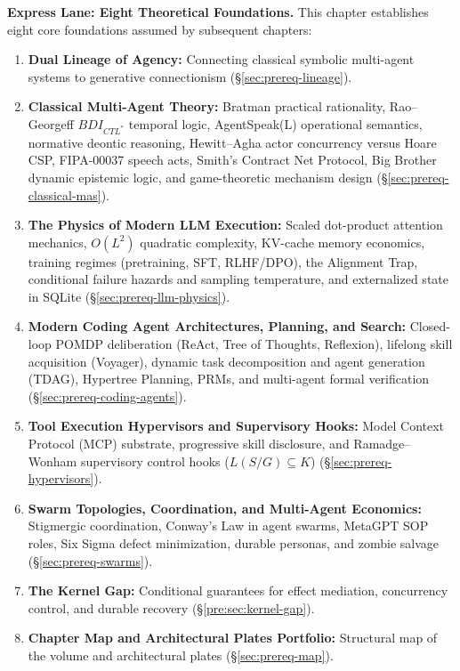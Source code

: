 \noindent\textbf{Express Lane: Eight Theoretical Foundations.} This chapter establishes eight core foundations assumed by subsequent chapters:
\begin{enumerate}[leftmargin=1.8em,itemsep=3pt]
  \item \textbf{Dual Lineage of Agency:} Connecting classical symbolic multi-agent systems to generative connectionism (\S\ref{sec:prereq-lineage}).
  \item \textbf{Classical Multi-Agent Theory:} Bratman practical rationality, Rao--Georgeff $BDI_{CTL^*}$ temporal logic, AgentSpeak(L) operational semantics, normative deontic reasoning, Hewitt--Agha actor concurrency versus Hoare CSP, FIPA-00037 speech acts, Smith's Contract Net Protocol, Big Brother dynamic epistemic logic, and game-theoretic mechanism design (\S\ref{sec:prereq-classical-mas}).
  \item \textbf{The Physics of Modern LLM Execution:} Scaled dot-product attention mechanics, $O(L^2)$ quadratic complexity, KV-cache memory economics, training regimes (pretraining, SFT, RLHF/DPO), the Alignment Trap, conditional failure hazards and sampling temperature, and externalized state in SQLite (\S\ref{sec:prereq-llm-physics}).
  \item \textbf{Modern Coding Agent Architectures, Planning, and Search:} Closed-loop POMDP deliberation (ReAct, Tree of Thoughts, Reflexion), lifelong skill acquisition (Voyager), dynamic task decomposition and agent generation (TDAG), Hypertree Planning, PRMs, and multi-agent formal verification (\S\ref{sec:prereq-coding-agents}).
  \item \textbf{Tool Execution Hypervisors and Supervisory Hooks:} Model Context Protocol (MCP) substrate, progressive skill disclosure, and Ramadge--Wonham supervisory control hooks ($L(S/G) \subseteq K$) (\S\ref{sec:prereq-hypervisors}).
  \item \textbf{Swarm Topologies, Coordination, and Multi-Agent Economics:} Stigmergic coordination, Conway's Law in agent swarms, MetaGPT SOP roles, Six Sigma defect minimization, durable personas, and zombie salvage (\S\ref{sec:prereq-swarms}).
  \item \textbf{The Kernel Gap:} Conditional guarantees for effect mediation, concurrency control, and durable recovery (\S\ref{pre:sec:kernel-gap}).
  \item \textbf{Chapter Map and Architectural Plates Portfolio:} Structural map of the volume and architectural plates (\S\ref{sec:prereq-map}).
\end{enumerate}

